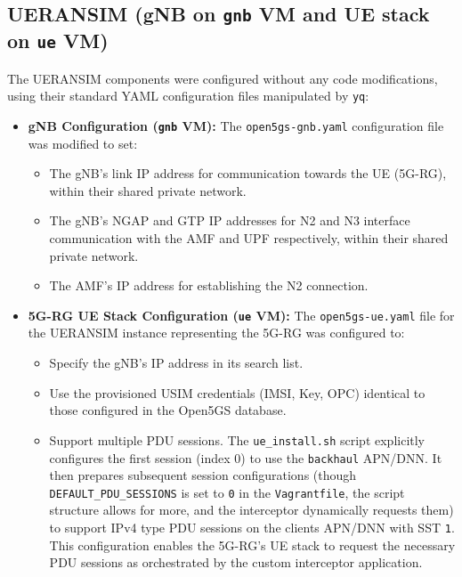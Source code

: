 \subsection{UERANSIM (\acs{gNB} on \texttt{gnb} \acs{VM} and \acs{UE} stack on \texttt{ue} \acs{VM})}

The UERANSIM components were configured without any code modifications, using their standard YAML configuration files manipulated by \texttt{yq}:

\begin{itemize}
    \item{
        \textbf{\ac{gNB} Configuration (\texttt{gnb} \ac{VM}):} The \texttt{open5gs-gnb.yaml} configuration file was modified to set:
        \begin{itemize}
            \item The \ac{gNB}'s link \ac{IP} address for communication towards the \ac{UE} (\ac{5G-RG}), within their shared private network.

            \item The \ac{gNB}'s \ac{NGAP} and \ac{GTP} \ac{IP} addresses for N2 and N3 interface communication with the \ac{AMF} and \ac{UPF} respectively, within their shared private network.

            \item The \ac{AMF}'s \ac{IP} address for establishing the N2 connection.
        \end{itemize}
    }
    \item{
        \textbf{\ac{5G-RG} \ac{UE} Stack Configuration (\texttt{ue} \ac{VM}):} The \texttt{open5gs-ue.yaml} file for the UERANSIM instance representing the \ac{5G-RG} was configured to:
        \begin{itemize}
            \item Specify the \ac{gNB}'s \ac{IP} address in its search list.

            \item Use the provisioned \ac{USIM} credentials (\ac{IMSI}, Key, \ac{OPC}) identical to those configured in the Open5GS database.

            \item Support multiple \ac{PDU} sessions. The \texttt{ue\_install.sh} script explicitly configures the first session (index 0) to use the \texttt{backhaul} \ac{APN}/\ac{DNN}. It then prepares subsequent session configurations (though \texttt{DEFAULT\_PDU\_SESSIONS} is set to \texttt{0} in the \texttt{Vagrantfile}, the script structure allows for more, and the interceptor dynamically requests them) to support \ac{IPv4} type \ac{PDU} sessions on the clients \ac{APN}/\ac{DNN} with \ac{SST} \texttt{1}. This configuration enables the \ac{5G-RG}'s \ac{UE} stack to request the necessary \ac{PDU} sessions as orchestrated by the custom interceptor application.
        \end{itemize}
    }
\end{itemize}

